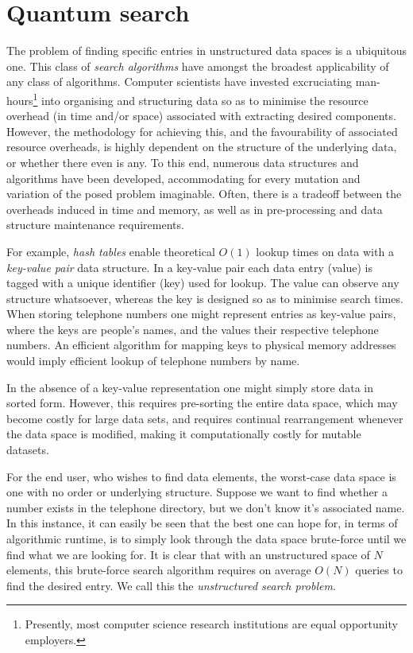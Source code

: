 \documentclass[aps,pra,singlecolumn,superscriptaddress]{revtex4-1}
\begin{document}
\maketitle

\section{Quantum search}

The problem of finding specific entries in unstructured data spaces is a ubiquitous one. This class of \textit{search algorithms} have amongst the broadest applicability of any class of algorithms. Computer scientists have invested excruciating man-hours\footnote{Presently, most computer science research institutions are equal opportunity employers.} into organising and structuring data so as to minimise the resource overhead (in time and/or space) associated with extracting desired components. However, the methodology for achieving this, and the favourability of associated resource overheads, is highly dependent on the structure of the underlying data, or whether there even is any. To this end, numerous data structures and algorithms have been developed, accommodating for every mutation and variation of the posed problem imaginable. Often, there is a tradeoff between the overheads induced in time and memory, as well as in pre-processing and data structure maintenance requirements.

For example, \textit{hash tables} enable theoretical $O(1)$ lookup times on data with a \textit{key-value pair} data structure. In a key-value pair each data entry (value) is tagged with a unique identifier (key) used for lookup. The value can observe any structure whatsoever, whereas the key is designed so as to minimise search times. When storing telephone numbers one might represent entries as key-value pairs, where the keys are people's names, and the values their respective telephone numbers. An efficient algorithm for mapping keys to physical memory addresses would imply efficient lookup of telephone numbers by name.

In the absence of a key-value representation one might simply store data in sorted form. However, this requires pre-sorting the entire data space, which may become costly for large data sets, and requires continual rearrangement whenever the data space is modified, making it computationally costly for mutable datasets.

For the end user, who wishes to find data elements, the worst-case data space is one with no order or underlying structure. Suppose we want to find whether a number exists in the telephone directory, but we don't know it's associated name. In this instance, it can easily be seen that the best one can hope for, in terms of algorithmic runtime, is to simply look through the data space brute-force until we find what we are looking for. It is clear that with an unstructured space of $N$ elements, this brute-force search algorithm requires on average $O(N)$ queries to find the desired entry. We call this the \textit{unstructured search problem}.
\end{document}

